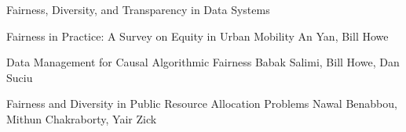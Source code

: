 \documentclass[11pt]{article}
\begin{document}
\begin{bulletin}
\begin{articlesection}{Fairness, Diversity, and Transparency in Data Systems}
%
%
%

\begin{article}
{Fairness in Practice: A Survey on Equity in Urban Mobility}
{An Yan, Bill Howe}
\graphicspath{{submissions/Howe/}}

\end{article}



\begin{article}
{Data Management for Causal Algorithmic Fairness}
{Babak Salimi, Bill Howe, Dan Suciu}
\graphicspath{{submissions/Salimi/salimi/}}

\end{article}


\begin{article}
{Fairness and Diversity in Public Resource Allocation Problems}
{Nawal Benabbou, Mithun Chakraborty, Yair Zick}
\graphicspath{{submissions/Zick/}}

\end{article}

\end{articlesection}




%
%



\end{bulletin}
\end{document}
